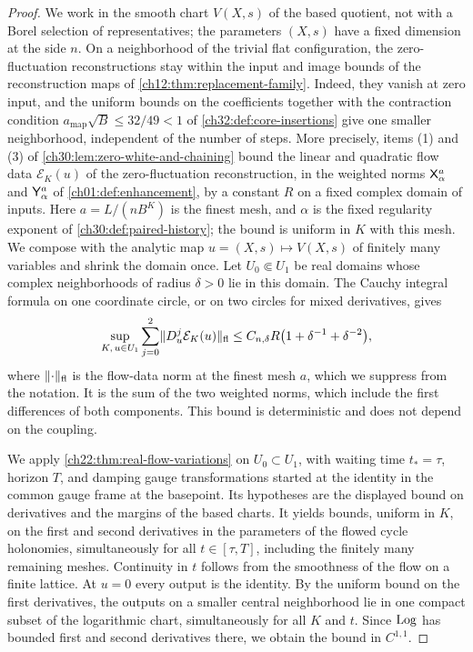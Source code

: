 \begin{proof}
We work in the smooth chart $V(X,s)$ of the based quotient, not with a Borel selection of representatives; the parameters $(X,s)$ have a fixed dimension at the side $n$. On a neighborhood of the trivial flat configuration, the zero-fluctuation reconstructions stay within the input and image bounds of the reconstruction maps of \cref{ch12:thm:replacement-family}. Indeed, they vanish at zero input, and the uniform bounds on the coefficients together with the contraction condition $a_{\mathrm{map}}\sqrt B\le32/49<1$ of \cref{ch32:def:core-insertions} give one smaller neighborhood, independent of the number of steps. More precisely, items (1) and (3) of \cref{ch30:lem:zero-white-and-chaining} bound the linear and quadratic flow data $\mathcal E_K(u)$ of the zero-fluctuation reconstruction, in the weighted norms $\mathsf X_{\alpha}^{a}$ and $\mathsf Y_{\alpha}^{a}$ of \cref{ch01:def:enhancement}, by a constant $R$ on a fixed complex domain of inputs. Here $a=L/(nB^K)$ is the finest mesh, and $\alpha$ is the fixed regularity exponent of \cref{ch30:def:paired-history}; the bound is uniform in $K$ with this mesh. We compose with the analytic map $u=(X,s)\mapsto V(X,s)$ of finitely many variables and shrink the domain once. Let $U_0\Subset U_1$ be real domains whose complex neighborhoods of radius $\delta>0$ lie in this domain. The Cauchy integral formula on one coordinate circle, or on two circles for mixed derivatives, gives
\[
 \sup_{K,\,u\in U_1}\sum_{j=0}^2\lVert D_u^j\mathcal E_K(u)\rVert_{\mathrm{fl}}\le C_{n,\delta}R\bigl(1+\delta^{-1}+\delta^{-2}\bigr),
\]
where $\lVert \cdot\rVert_{\mathrm{fl}}$ is the flow-data norm at the finest mesh $a$, which we suppress from the notation. It is the sum of the two weighted norms, which include the first differences of both components. This bound is deterministic and does not depend on the coupling.

We apply \cref{ch22:thm:real-flow-variations} on $U_0\subset U_1$, with waiting time $t_*=\tau$, horizon $T$, and damping gauge transformations started at the identity in the common gauge frame at the basepoint. Its hypotheses are the displayed bound on derivatives and the margins of the based charts. It yields bounds, uniform in $K$, on the first and second derivatives in the parameters of the flowed cycle holonomies, simultaneously for all $t\in[\tau,T]$, including the finitely many remaining meshes. Continuity in $t$ follows from the smoothness of the flow on a finite lattice. At $u=0$ every output is the identity. By the uniform bound on the first derivatives, the outputs on a smaller central neighborhood lie in one compact subset of the logarithmic chart, simultaneously for all $K$ and $t$. Since $\operatorname{Log}$ has bounded first and second derivatives there, we obtain the bound in $C^{1,1}$.


\end{proof}

